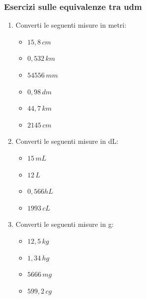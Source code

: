 \documentclass[handout]{beamer}
\theoremstyle{plain}
\begin{document}
\begin{frame}
\frametitle{Esercizi sulle equivalenze tra udm}
\begin{enumerate}\setcounter{enumi}{0}
  \item Converti le seguenti misure in metri:
  \begin{multicols}{2}
    \begin{itemize}
        \item $ 15,8 \, cm $
        \item $ 0,532 \, km $
        \item $ 54556 \, mm $
        \item $ 0,98 \, dm $
        \item $ 44,7 \, km $
        \item $ 2145 \, cm $
    \end{itemize}
  \end{multicols}
  \item Converti le seguenti misure in dL:
  \begin{multicols}{2}
    \begin{itemize}
        \item $ 15 \, mL $
        \item $ 12 \, L $
        \item $ 0,566 hL $
        \item $ 1993 \, cL $
    \end{itemize}
  \end{multicols}
  \item Converti le seguenti misure in g:
  \begin{multicols}{2}
    \begin{itemize}
        \item $ 12,5 \, kg $
        \item $ 1,34 \, hg $
        \item $ 5666 \, mg $
        \item $ 599,2 \, cg $
    \end{itemize}
  \end{multicols}
\end{enumerate}
\end{frame}
\end{document}
